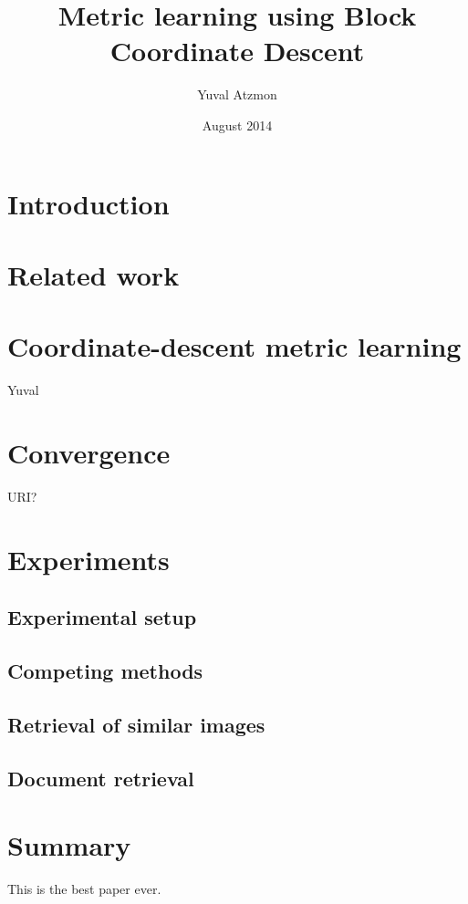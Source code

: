 \documentclass{article}
\title{Metric learning using Block Coordinate Descent}
\author{Yuval Atzmon}
\date{August 2014}
\begin{document}
\maketitle

\section{Introduction}

\section{Related work}

\section{Coordinate-descent metric learning}
Yuval


\section{Convergence}
URI?

\section{Experiments}
\subsection{Experimental setup}
\subsection{Competing methods}
\subsection{Retrieval of similar images}
\subsection{Document retrieval}


\section{Summary}
This is the best paper ever.
\end{document}
